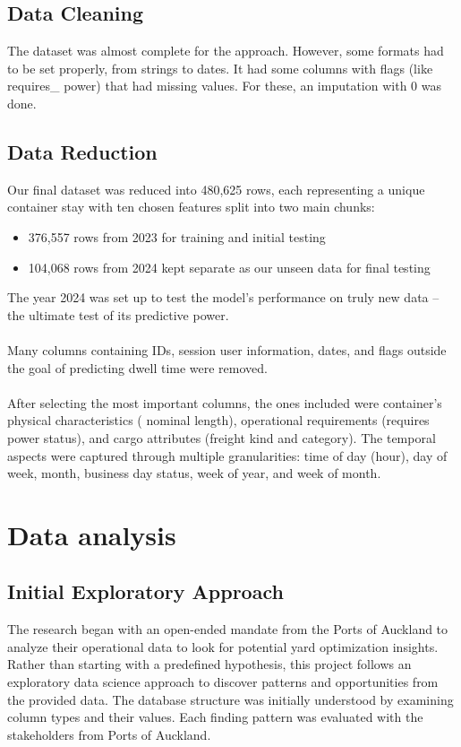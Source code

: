 		\subsection{Data Cleaning}

			The dataset was almost complete for the approach. However, some formats had to be set properly, from
			strings to dates. It had some columns with flags (like requires\_
			power) that had missing values. For these, an imputation with 0 was done.

		\subsection{Data Reduction}
			Our final dataset was reduced into 480,625 rows, each representing a unique container stay with ten chosen
			features split into two main chunks:

			\begin{itemize}
				\item 376,557 rows from 2023 for training and initial testing
				\item 104,068 rows from 2024 kept separate as our unseen data for final testing
			\end{itemize}
			The year 2024 was set up to test the model's performance on truly new data – the ultimate test of its
			predictive power.
			\\
			\\
			Many columns containing IDs, session user information, dates, and flags outside the goal of predicting
			dwell time were removed.
			\\
			\\
			After selecting the most important columns, the ones included were container's physical characteristics (
			nominal length), operational requirements (requires power status), and cargo attributes (freight kind and
			category). The temporal aspects were captured through multiple granularities: time of day (hour), day of
			week, month, business day status, week of year, and week of month.


	\section{Data analysis}

		\subsection{Initial Exploratory Approach}
			The research began with an open-ended mandate from the Ports of Auckland to analyze their operational data
			to look for potential yard optimization insights. Rather than starting with a predefined hypothesis, this
			project follows an exploratory data science approach to discover patterns and opportunities from the
			provided data. The database structure was initially understood by examining column types and their values.
			Each finding pattern was evaluated with the stakeholders from Ports of Auckland.

